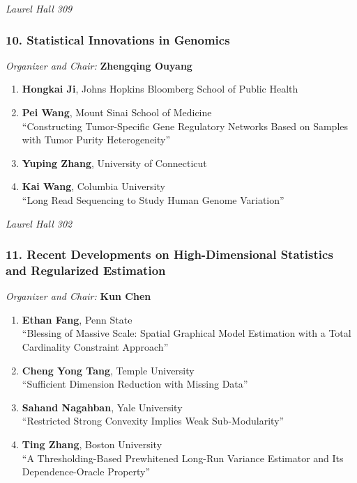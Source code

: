 \emph{Laurel Hall 309} \\[.5em]

\subsubsection*{10. Statistical Innovations in Genomics}

\emph{Organizer and Chair:} \textbf{Zhengqing Ouyang}

\begin{enumerate}
\item \textbf{Hongkai Ji}, Johns Hopkins Bloomberg School of Public Health 
\item \textbf{Pei Wang}, Mount Sinai School of Medicine \\
``Constructing Tumor-Specific Gene Regulatory Networks Based on Samples with Tumor Purity Heterogeneity''
\item \textbf{Yuping Zhang}, University of Connecticut 
\item \textbf{Kai Wang}, Columbia University \\
``Long Read Sequencing to Study Human Genome Variation''
\end{enumerate}

\emph{Laurel Hall 302} \\[.5em]

\subsubsection*{11. Recent Developments on High-Dimensional Statistics and Regularized Estimation}

\emph{Organizer and Chair:} \textbf{Kun Chen}

\begin{enumerate}
\item \textbf{Ethan Fang}, Penn State \\
``Blessing of Massive Scale: Spatial Graphical Model Estimation with a Total Cardinality Constraint Approach''
\item \textbf{Cheng Yong Tang}, Temple University \\
``Sufficient Dimension Reduction with Missing Data''
\item \textbf{Sahand Nagahban}, Yale University \\
``Restricted Strong Convexity Implies Weak Sub-Modularity''
\item \textbf{Ting Zhang}, Boston University \\
``A Thresholding-Based Prewhitened Long-Run Variance Estimator and Its Dependence-Oracle Property''
\end{enumerate}

